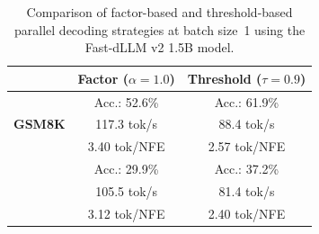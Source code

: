 %
%

\begin{table}[t]
\centering
\caption{%
  Comparison of factor-based and threshold-based parallel decoding strategies
  at batch size~1 using the Fast-dLLM v2 1.5B model.
}
\label{tab:factor-vs-threshold-batch1}
\setlength{\tabcolsep}{8pt}
\begin{tabular}{l cc}
\toprule
& \textbf{Factor ($\alpha=1.0$)} & \textbf{Threshold ($\tau=0.9$)} \\
\midrule
\multirow{3}{*}{\textbf{GSM8K}}
  & Acc.: 52.6\%    & Acc.: 61.9\% \\
  & 117.3 tok/s     & 88.4 tok/s \\
  & 3.40 tok/NFE    & 2.57 tok/NFE \\
\addlinespace
\multirow{3}{*}{\textbf{HumanEval}}
  & Acc.: 29.9\%    & Acc.: 37.2\% \\
  & 105.5 tok/s     & 81.4 tok/s \\
  & 3.12 tok/NFE    & 2.40 tok/NFE \\
\bottomrule
\end{tabular}
\end{table}
